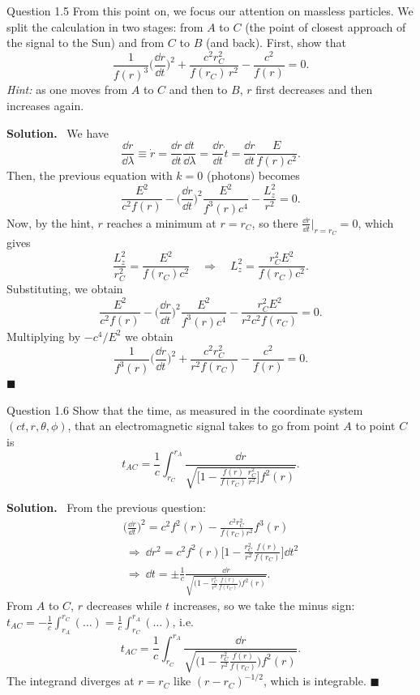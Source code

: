 \documentclass[11pt,a4paper]{article}
\numberwithin{equation}{subsection}
\newenvironment{solution}{\par\noindent\textbf{\textcolor{excol!70!black}{Solution.}}\ }{\hfill$\blacksquare$\par\medskip}
\newcommand{\added}[1]{{\color{teal!60!black}#1}}
\begin{document}
\begin{problem}{Question 1.5}
From this point on, we focus our attention on massless particles. We split the calculation in two stages: from $A$ to $C$ (the point of closest approach of the signal to the Sun) and from $C$ to $B$ (and back). First, show that
\[
  \frac{1}{f(r)^3}\Big(\frac{\dd r}{\dd t}\Big)^2+\frac{c^2r_C^2}{f(r_C)\,r^2}-\frac{c^2}{f(r)}=0. \tag{1.7}
\]
\emph{Hint:} as one moves from $A$ to $C$ and then to $B$, $r$ first decreases and then increases again.
\end{problem}
\begin{solution}
We have
\[
  \frac{\dd r}{\dd\lambda}\equiv\dot r=\frac{\dd r}{\dd t}\frac{\dd t}{\dd\lambda}=\frac{\dd r}{\dd t}\dot t=\frac{\dd r}{\dd t}\frac{E}{f(r)c^2}.
\]
Then, the previous equation with $k=0$ (photons) becomes
\[
  \frac{E^2}{c^2f(r)}-\Big(\frac{\dd r}{\dd t}\Big)^2\frac{E^2}{f^3(r)c^4}-\frac{L_z^2}{r^2}=0 .
\]
Now, by the hint, $r$ reaches a minimum at $r=r_C$, so there $\frac{\dd r}{\dd t}\big|_{r=r_C}=0$, which gives
\[
  \frac{L_z^2}{r_C^2}=\frac{E^2}{f(r_C)c^2}\quad\Longrightarrow\quad L_z^2=\frac{r_C^2E^2}{f(r_C)c^2}.
\]
Substituting, we obtain
\[
  \frac{E^2}{c^2f(r)}-\Big(\frac{\dd r}{\dd t}\Big)^2\frac{E^2}{f^3(r)c^4}-\frac{r_C^2E^2}{r^2c^2f(r_C)}=0 .
\]
Multiplying by $-c^4/E^2$ we obtain
\[
  \frac{1}{f^3(r)}\Big(\frac{\dd r}{\dd t}\Big)^2+\frac{c^2r_C^2}{r^2f(r_C)}-\frac{c^2}{f(r)}=0 .
\]
\end{solution}

\begin{problem}{Question 1.6}
Show that the time, as measured in the coordinate system $(ct,r,\theta,\phi)$, that an electromagnetic signal takes to go from point $A$ to point $C$ is
\[
  t_{AC}=\frac1c\int_{r_C}^{r_A}\frac{\dd r}{\sqrt{\Big[1-\frac{f(r)}{f(r_C)}\frac{r_C^2}{r^2}\Big]f^2(r)}} . \tag{1.8}
\]
\end{problem}
\begin{solution}
From the previous question:
\begin{gather*}
  \Big(\frac{\dd r}{\dd t}\Big)^2=c^2f^2(r)-\frac{c^2r_C^2}{f(r_C)r^2}f^3(r)\\
  \ \Rightarrow\ \dd r^2=c^2f^2(r)\Big[1-\frac{r_C^2}{r^2}\frac{f(r)}{f(r_C)}\Big]\dd t^2\\
  \ \Rightarrow\ \dd t=\pm\frac1c\frac{\dd r}{\sqrt{\Big(1-\frac{r_C^2}{r^2}\frac{f(r)}{f(r_C)}\Big)f^2(r)}} .
\end{gather*}
From $A$ to $C$, $r$ decreases while $t$ increases, so we take the minus sign: $t_{AC}=-\frac1c\int_{r_A}^{r_C}(\dots)=\frac1c\int_{r_C}^{r_A}(\dots)$, i.e.
\[
  t_{AC}=\frac1c\int_{r_C}^{r_A}\frac{\dd r}{\sqrt{\Big(1-\frac{r_C^2}{r^2}\frac{f(r)}{f(r_C)}\Big)f^2(r)}} .
\]
\added{The integrand diverges at $r=r_C$ like $(r-r_C)^{-1/2}$, which is integrable.}
\end{solution}
\end{document}

